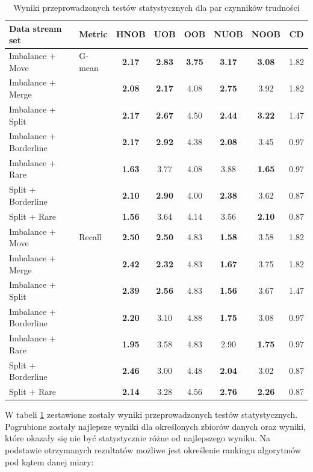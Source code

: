 \begin{table}[ht]
\centering\small%
\setlength{\tabcolsep}{10pt} 
\renewcommand{\arraystretch}{1.5} 
\begin{tabular}{l l c c c c c c}
\toprule
Data stream set & Metric & HNOB & UOB & OOB & NUOB & NOOB & CD \\
\midrule
Imbalance + Move & G-mean & \textbf{2.17} & \textbf{2.83} & \textbf{3.75} & \textbf{3.17} & \textbf{3.08} & 1.82 \\
Imbalance + Merge  & & \textbf{2.08} & \textbf{2.17} & 4.08 & \textbf{2.75} & 3.92 & 1.82 \\
Imbalance + Split  & & \textbf{2.17} & \textbf{2.67} & 4.50 & \textbf{2.44} & \textbf{3.22} & 1.47 \\
Imbalance + Borderline  & & \textbf{2.17} & \textbf{2.92} & 4.38 & \textbf{2.08} & 3.45 & 0.97 \\
Imbalance + Rare  & & \textbf{1.63} & 3.77 & 4.08 & 3.88 & \textbf{1.65} & 0.97 \\
Split + Borderline  & & \textbf{2.10} & \textbf{2.90} & 4.00 & \textbf{2.38} & 3.62 & 0.87 \\
Split + Rare  & & \textbf{1.56} & 3.64 & 4.14 & 3.56 & \textbf{2.10} & 0.87 \\
Imbalance + Move & Recall & \textbf{2.50} & \textbf{2.50} & 4.83 & \textbf{1.58} & 3.58 & 1.82 \\
Imbalance + Merge  & & \textbf{2.42} & \textbf{2.32} & 4.83 & \textbf{1.67} & 3.75 & 1.82 \\
Imbalance + Split  & & \textbf{2.39} & \textbf{2.56} & 4.83 & \textbf{1.56} & 3.67 & 1.47 \\
Imbalance + Borderline  & & \textbf{2.20} & 3.10 & 4.88 & \textbf{1.75} & 3.08 & 0.97 \\
Imbalance + Rare  & & \textbf{1.95} & 3.58 & 4.83 & 2.90 & \textbf{1.75} & 0.97 \\
Split + Borderline  & & \textbf{2.46} & 3.00 & 4.48 & \textbf{2.04} & 3.02 & 0.87 \\
Split + Rare  & & \textbf{2.14} & 3.28 & 4.56 & \textbf{2.76} & \textbf{2.26} & 0.87 \\
\bottomrule
\end{tabular}
\caption{Wyniki przeprowadzonych testów statystycznych dla par czynników trudności}\label{Tab:DoubleDriftFriedmanHNOB}
\end{table}

\noindent W tabeli \ref{Tab:DoubleDriftFriedmanHNOB} zestawione zostały wyniki przeprowadzonych testów statystycznych. Pogrubione zostały najlepsze wyniki dla określonych zbiorów danych oraz wyniki, które okazały się nie być statystycznie różne od najlepszego wyniku. Na podstawie otrzymanych rezultatów możliwe jest określenie rankingu algorytmów pod kątem danej miary:

